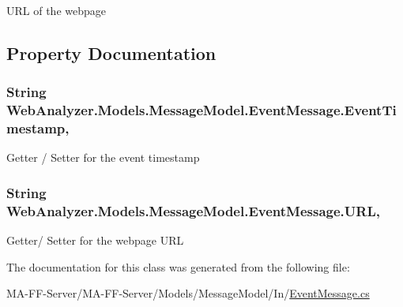 U\+R\+L of the webpage 



\subsection{Property Documentation}
\hypertarget{class_web_analyzer_1_1_models_1_1_message_model_1_1_event_message_a5014b7357295d3607057ff71c949b913}{}
\subsubsection[{Event\+Timestamp}]{\setlength{\rightskip}{0pt plus 5cm}String Web\+Analyzer.\+Models.\+Message\+Model.\+Event\+Message.\+Event\+Timestamp\hspace{0.3cm}{\ttfamily [get]}, {\ttfamily [set]}}\label{class_web_analyzer_1_1_models_1_1_message_model_1_1_event_message_a5014b7357295d3607057ff71c949b913}


Getter / Setter for the event timestamp 

\hypertarget{class_web_analyzer_1_1_models_1_1_message_model_1_1_event_message_a29a86382ec9c22a11920131a9b1ab644}{}
\subsubsection[{U\+R\+L}]{\setlength{\rightskip}{0pt plus 5cm}String Web\+Analyzer.\+Models.\+Message\+Model.\+Event\+Message.\+U\+R\+L\hspace{0.3cm}{\ttfamily [get]}, {\ttfamily [set]}}\label{class_web_analyzer_1_1_models_1_1_message_model_1_1_event_message_a29a86382ec9c22a11920131a9b1ab644}


Getter/ Setter for the webpage U\+R\+L 



The documentation for this class was generated from the following file\+:\begin{DoxyCompactItemize}
\item 
M\+A-\/\+F\+F-\/\+Server/\+M\+A-\/\+F\+F-\/\+Server/\+Models/\+Message\+Model/\+In/\hyperlink{_event_message_8cs}{Event\+Message.\+cs}\end{DoxyCompactItemize}
